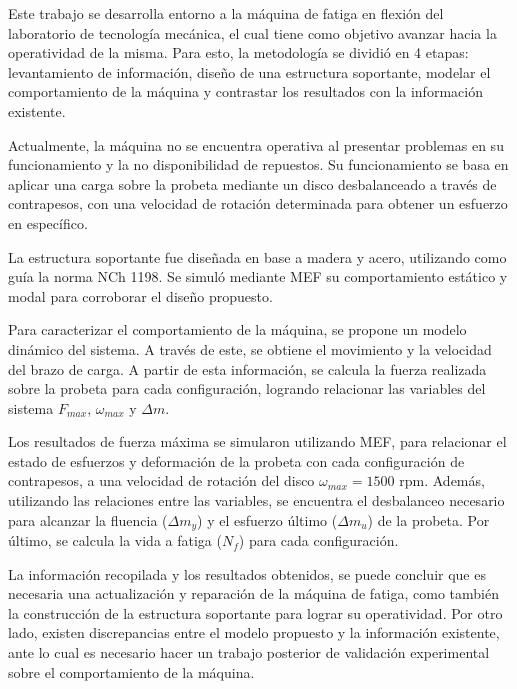 
Este trabajo se desarrolla entorno a la máquina de fatiga en flexión del laboratorio de tecnología mecánica, el cual tiene como objetivo avanzar hacia la operatividad de la misma. Para esto, la metodología se dividió en 4 etapas: levantamiento de información, diseño de una estructura soportante, modelar el comportamiento de la máquina y contrastar los resultados con la información existente.

Actualmente, la máquina no se encuentra operativa al presentar problemas en su funcionamiento y la no disponibilidad de repuestos. Su funcionamiento se basa en aplicar una carga sobre la probeta mediante un disco desbalanceado a través de contrapesos, con una velocidad de rotación determinada para obtener un esfuerzo en específico.

La estructura soportante fue diseñada en base a madera y acero, utilizando como guía la norma NCh 1198. Se simuló mediante MEF su comportamiento estático y modal para corroborar el diseño propuesto.

Para caracterizar el comportamiento de la máquina, se propone un modelo dinámico del sistema. A través de este, se obtiene el movimiento y la velocidad del brazo de carga. A partir de esta información, se calcula la fuerza realizada sobre la probeta para cada configuración, logrando relacionar las variables del sistema $F_{max}$, $\omega_{max}$ y $\Delta m$. 

Los resultados de fuerza máxima se simularon utilizando MEF, para relacionar el estado de esfuerzos y deformación de la probeta con cada configuración de contrapesos, a una velocidad de rotación del disco $\omega_{max}=1500$ rpm. Además, utilizando las relaciones entre las variables, se encuentra el desbalanceo necesario para alcanzar la fluencia ($\Delta m_y$) y el esfuerzo último ($\Delta m_u$) de la probeta. Por último, se calcula la vida a fatiga ($N_f$) para cada configuración.

La información recopilada y los resultados obtenidos, se puede concluir que es necesaria una actualización y reparación de la máquina de fatiga, como también la construcción de la estructura soportante para lograr su operatividad. Por otro lado, existen discrepancias entre el modelo propuesto y la información existente, ante lo cual es necesario hacer un trabajo posterior de validación experimental sobre el comportamiento de la máquina.



